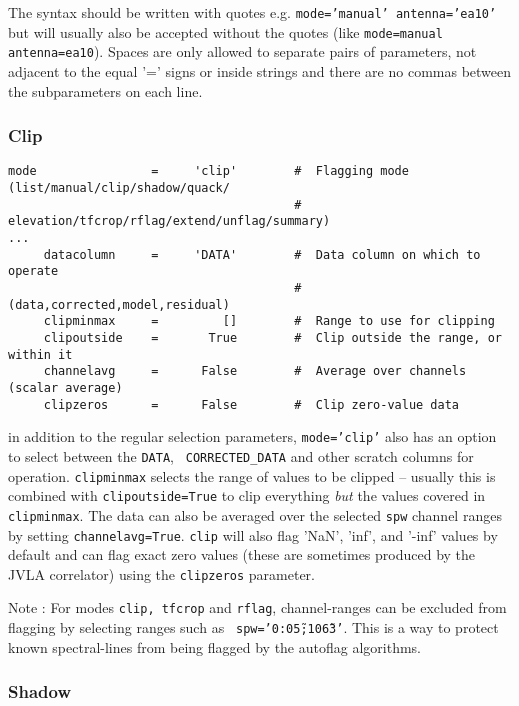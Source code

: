 The syntax should be written with quotes e.g. {\tt mode='manual'
  antenna='ea10'} but will usually also be accepted without the quotes
(like {\tt mode=manual antenna=ea10}). Spaces are only allowed to
separate pairs of parameters, not adjacent to the equal '=' signs or
inside strings and there are no commas between the subparameters on each line.




\subsubsection{Clip}
\label{section:edit.flagdata.mode.clip}

\small
\begin{verbatim}
mode                =     'clip'        #  Flagging mode (list/manual/clip/shadow/quack/
                                        #  elevation/tfcrop/rflag/extend/unflag/summary)
...
     datacolumn     =     'DATA'        #  Data column on which to operate
                                        #   (data,corrected,model,residual)
     clipminmax     =         []        #  Range to use for clipping
     clipoutside    =       True        #  Clip outside the range, or within it
     channelavg     =      False        #  Average over channels (scalar average)
     clipzeros      =      False        #  Clip zero-value data
\end{verbatim}
\normalsize

in addition to the regular selection parameters, {\tt mode='clip'}
also has an option to select between the {\tt DATA}, {\tt
  CORRECTED\_DATA} and other scratch columns for 
operation. {\tt clipminmax} selects the range of values to be clipped
-- usually this is combined with {\tt clipoutside=True} to clip
everything {\it but} the values covered in {\tt clipminmax}. The data can
also be averaged over the selected {\tt spw} channel ranges by setting
{\tt channelavg=True}. {\tt clip} will also flag 'NaN', 'inf', and
'-inf' values by default and can flag exact zero values (these are sometimes
produced by the JVLA correlator) using the {\tt clipzeros} parameter.


Note : For modes {\tt clip, tfcrop} and {\tt rflag}, channel-ranges
can be excluded from flagging by selecting ranges such as {\tt
  spw='0:0\~5;10\~63'}. This is a way to protect known spectral-lines
from being flagged by the autoflag algorithms.


\subsubsection{Shadow}
\label{section:edit.flagdata.mode.shadow}

